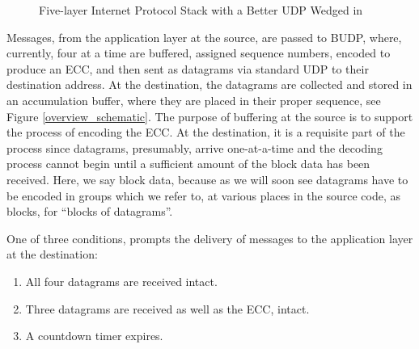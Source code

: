 \documentclass[conference]{IEEEtran}
\theoremstyle{definition}
\begin{document}
\begin{figure}[h!]                                                          %
\centering                                                                  %
\resizebox{0.150\textwidth}{!}{}
\caption{Five-layer Internet Protocol Stack with a Better UDP Wedged in}    %
\label{ip_stack}                                                            %
\end{figure}                                                                %


Messages, from the application layer at the source, are
passed to BUDP, where, currently, four at a time are
buffered, assigned sequence numbers, encoded to produce
an ECC, and then sent as datagrams via standard UDP to
their destination address. At the destination, the
datagrams are collected and stored in an accumulation
buffer, where they are placed in their proper sequence,
see Figure \ref{overview_schematic}.  The purpose of
buffering at the source is to support the process of
encoding the ECC.  At the destination, it is a requisite
part of the process since datagrams, presumably, arrive
one-at-a-time and the decoding process cannot begin until
a sufficient amount of the block data has been received.
Here, we say block data, because as we will soon see
datagrams have to be encoded in groups which we refer
to, at various places in the source code, as blocks,
for ``blocks of datagrams''.

One of three conditions, prompts the delivery of messages
to the application layer at the destination:

\begin{enumerate}
 \item All four datagrams are received intact.
 \item Three datagrams are received as well as
       the ECC, intact.
 \item A countdown timer expires.
\end{enumerate}
\end{document}

